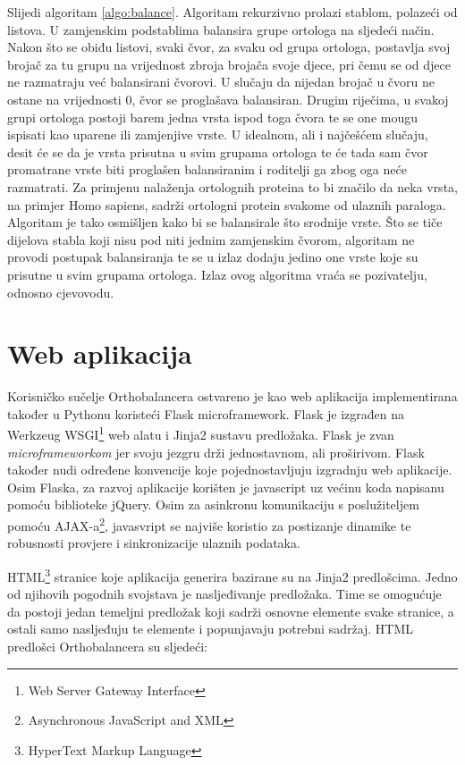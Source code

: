 Slijedi algoritam \ref{algo:balance}. Algoritam rekurzivno prolazi stablom,
polazeći od listova. U zamjenskim podstablima balansira grupe ortologa na
sljedeći način. Nakon što se obiđu listovi, svaki čvor, za svaku od grupa
ortologa, postavlja svoj brojač za tu grupu na vrijednost zbroja brojača svoje
djece, pri čemu se od djece ne razmatraju već balansirani čvorovi. U slučaju da
nijedan brojač u čvoru ne ostane na vrijednosti $0$, čvor se proglašava
balansiran. Drugim riječima, u svakoj grupi ortologa postoji barem jedna vrsta
ispod toga čvora te se one mougu ispisati kao uparene ili zamjenjive vrste.  U
idealnom, ali i najčešćem slučaju, desit će se da je vrsta prisutna u svim
grupama ortologa te će tada sam čvor promatrane vrste biti proglašen
balansiranim i roditelji ga zbog oga neće razmatrati. Za primjenu nalaženja
ortolognih proteina to bi značilo da neka vrsta, na primjer Homo sapiens, sadrži
ortologni protein svakome od ulaznih paraloga. Algoritam je tako osmišljen kako
bi se balansirale što srodnije vrste.  Što se tiče dijelova stabla koji nisu pod
niti jednim zamjenskim čvorom, algoritam ne provodi postupak balansiranja te se
u izlaz dodaju jedino one vrste koje su prisutne u svim grupama ortologa. Izlaz
ovog algoritma vraća se pozivatelju, odnosno cjevovodu.


\section{Web aplikacija}
\label{sec:server}

Korisničko sučelje Orthobalancera ostvareno je kao web aplikacija implementirana
također u Pythonu koristeći Flask microframework. Flask je izgrađen na Werkzeug
WSGI\footnote{Web Server Gateway Interface\cite{pep333}} web alatu i Jinja2
sustavu predložaka. Flask je zvan \emph{microframeworkom} jer svoju jezgru drži
jednostavnom, ali proširivom. Flask također nudi određene konvencije koje
pojednostavljuju izgradnju web aplikacije. Osim Flaska, za razvoj aplikacije
korišten je javascript uz većinu koda napisanu pomoću biblioteke jQuery. Osim za
asinkronu komunikaciju s poslužiteljem pomoću AJAX-a\footnote{Asynchronous
JavaScript and XML}, javasvript se najviše koristio za postizanje dinamike te
robusnosti provjere i sinkronizacije ulaznih podataka.

HTML\footnote{HyperText Markup Language} stranice koje aplikacija generira
bazirane su na Jinja2 predlošcima. Jedno od njihovih pogodnih svojstava je
nasljeđivanje predložaka. Time se omogućuje da postoji jedan temeljni predložak
koji sadrži osnovne elemente svake stranice, a ostali samo nasljeđuju te
elemente i popunjavaju potrebni sadržaj. HTML predlošci Orthobalancera su
sljedeći:


